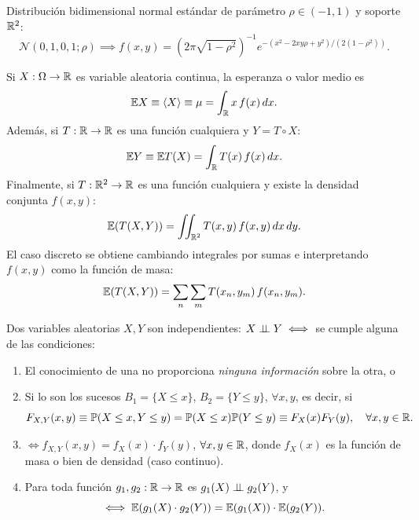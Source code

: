 \begin{ejemplo}[20]
Distribución bidimensional normal estándar de parámetro $\rho \in (-1, 1)$ y soporte $\mathbb{R}^2$:
\[
  \mathcal{N}(0, 1, 0, 1; \rho) \implies f(x,y) = \left(2\pi\sqrt{1-\rho^2}\right)^{-1} e^{-(x^2 - 2xy\rho + y^2)/(2(1-\rho^2))}.
\]
\end{ejemplo}

\begin{definicion}[17]
Si $X : \Omega \to \mathbb{R}$ es variable aleatoria continua, la esperanza o valor medio es
\[
  \mathbb{E} X \equiv \langle X \rangle \equiv \mu = \int_{\mathbb{R}} x\,f(x)\,dx.
\]
Además, si $T : \mathbb{R} \to \mathbb{R}$ es una función cualquiera y $Y = T \circ X$:
\[
  \mathbb{E} Y \equiv \mathbb{E} T(X) = \int_{\mathbb{R}} T(x)\,f(x)\,dx.
\]
Finalmente, si $T : \mathbb{R}^2 \to \mathbb{R}$ es una función cualquiera y existe la densidad conjunta $f(x,y)$:
\begin{equation*}
  \mathbb{E}(T(X,Y)) = \iint_{\mathbb{R}^2} T(x,y)\,f(x,y)\,dx\,dy.
\end{equation*}
El caso discreto se obtiene cambiando integrales por sumas e interpretando $f(x,y)$ como la función de masa:
\begin{equation*}
  \mathbb{E}(T(X,Y)) = \sum_n \sum_m T(x_n, y_m)\,f(x_n, y_m).
\end{equation*}
\end{definicion}

\begin{definicion}[18]
Dos variables aleatorias $X, Y$ son independientes: $X \perp\!\!\!\perp Y \iff$ se cumple alguna de las condiciones:
\begin{enumerate}
  \item El conocimiento de una no proporciona \emph{ninguna información} sobre la otra, o
  \item Si lo son los sucesos $B_1 = \{X \le x\}$, $B_2 = \{Y \le y\}$, $\forall x,y$, es decir, si
        \begin{equation*}
          F_{X,Y}(x,y) \equiv \mathbb{P}(X \le x, Y \le y) = \mathbb{P}(X \le x)\mathbb{P}(Y \le y) \equiv F_X(x)F_Y(y), \quad \forall x,y \in \mathbb{R}.
        \end{equation*}
  \item $\iff f_{X,Y}(x,y) = f_X(x) \cdot f_Y(y)$, $\forall x,y \in \mathbb{R}$, donde $f_X(x)$ es la función de masa o bien de densidad (caso continuo).
  \item Para toda función $g_1, g_2 : \mathbb{R} \to \mathbb{R}$ es $g_1(X) \perp\!\!\!\perp g_2(Y)$, y
        \[
          \iff \mathbb{E}(g_1(X) \cdot g_2(Y)) = \mathbb{E}(g_1(X)) \cdot \mathbb{E}(g_2(Y)).
        \]
\end{enumerate}
\end{definicion}

